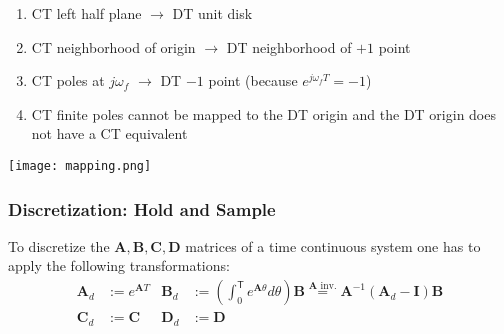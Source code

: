 \begin{enumerate}
    \item CT left half plane $\rightarrow$ DT unit disk
    \item CT neighborhood of origin $\rightarrow$ DT neighborhood of $+1$ point
    \item CT poles at $j\omega_f$ $\rightarrow$ DT $-1$ point (because $e^{j\omega_{f}T}=-1$)
    \item CT finite poles cannot be mapped to the DT origin and the DT origin does not have a CT equivalent
\end{enumerate}

\begin{center}
    \texttt{[image: mapping.png]}
\end{center}


\subsubsection{Discretization: Hold and Sample}\label{disc::hold_and_sample}

To discretize the $\mathbf{A}, \mathbf{B}, \mathbf{C}, \mathbf{D}$ matrices of a time continuous system one has to apply the following transformations:
\begin{align*}
    \mathbf{A}_d & :=e^{\mathbf{A}T} & \mathbf{B}_d & :=\left(\int_0^{\mathsf{T}} {e^{\mathbf{A}\theta}}d\theta\right)\mathbf{B} \overset{\mathbf{A} \text{ inv.}}{=} \mathbf{A}^{-1}\left(\mathbf{A}_d-\mathbf{I}\right)\mathbf{B} \\
    \mathbf{C}_d & :=\mathbf{C}      & \mathbf{D}_d & :=\mathbf{D}
\end{align*}

